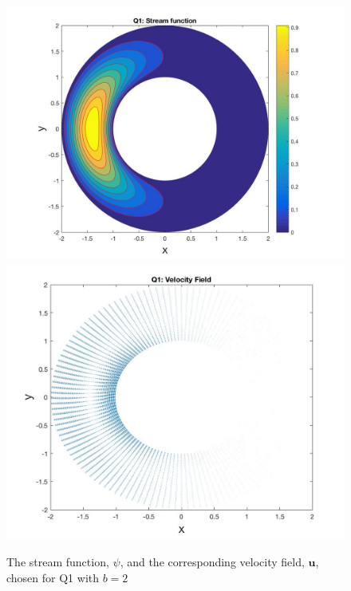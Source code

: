 \documentclass{article}
\begin{document}
	\begin{figure}[h!]
		\centering
		\includegraphics[width = \textwidth]{fig_q1_psi}
		\includegraphics[width = \textwidth]{fig_q1_u}
		\caption{The stream function, $\psi$, and the corresponding velocity field, $\textbf{u}$, chosen for Q1 with $b=2$}
		\label{fig:q1psi}
	\end{figure}
\end{document}
